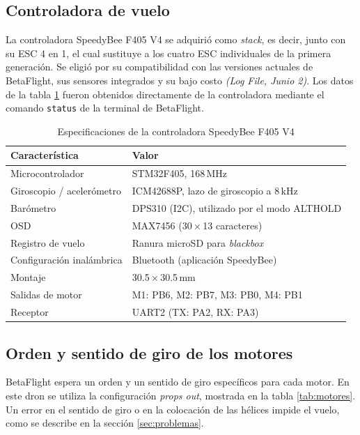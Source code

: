 \documentclass[11pt,letterpaper]{article}
\newcommand{\logref}[1]{\textit{(Log File, #1)}}
\begin{document}
\subsection{Controladora de vuelo}
La controladora SpeedyBee F405 V4 se adquirió como \textit{stack}, es decir, junto con su ESC 4 en 1, el cual sustituye a los cuatro ESC individuales de la primera generación. Se eligió por su compatibilidad con las versiones actuales de BetaFlight, sus sensores integrados y su bajo costo \logref{Junio 2}. Los datos de la tabla \ref{tab:fc} fueron obtenidos directamente de la controladora mediante el comando \texttt{status} de la terminal de BetaFlight.

\begin{table}[!h]
\centering
\caption{Especificaciones de la controladora SpeedyBee F405 V4}
\label{tab:fc}
\begin{tabularx}{\textwidth}{@{}lX@{}}
\toprule
\textbf{Característica} & \textbf{Valor} \\
\midrule
Microcontrolador & STM32F405, 168\,MHz \\
Giroscopio / acelerómetro & ICM42688P, lazo de giroscopio a 8\,kHz \\
Barómetro & DPS310 (I2C), utilizado por el modo ALTHOLD \\
OSD & MAX7456 (30\,$\times$\,13 caracteres) \\
Registro de vuelo & Ranura microSD para \textit{blackbox} \\
Configuración inalámbrica & Bluetooth (aplicación SpeedyBee) \\
Montaje & 30.5\,$\times$\,30.5\,mm \\
Salidas de motor & M1: PB6, M2: PB7, M3: PB0, M4: PB1 \\
Receptor & UART2 (TX: PA2, RX: PA3) \\
\bottomrule
\end{tabularx}
\end{table}

\subsection{Orden y sentido de giro de los motores}
BetaFlight espera un orden y un sentido de giro específicos para cada motor. En este dron se utiliza la configuración \textit{props out}, mostrada en la tabla \ref{tab:motores}. Un error en el sentido de giro o en la colocación de las hélices impide el vuelo, como se describe en la sección \ref{sec:problemas}.
\end{document}
